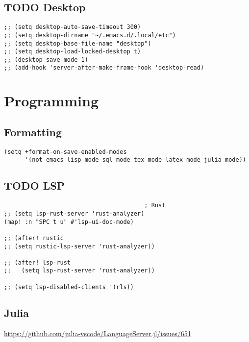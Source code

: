 \documentclass[8pt]{article}
\begin{document}
\subsection{{\bfseries\sffamily TODO} Desktop}
\label{sec:org691a6f0}
\begin{verbatim}
;; (setq desktop-auto-save-timeout 300)
;; (setq desktop-dirname "~/.emacs.d/.local/etc")
;; (setq desktop-base-file-name "desktop")
;; (setq desktop-load-locked-desktop t)
;; (desktop-save-mode 1)
;; (add-hook 'server-after-make-frame-hook 'desktop-read)
\end{verbatim}
\section{Programming}
\label{sec:org72c2fb0}
\subsection{Formatting}
\label{sec:orgc5ae76d}
\begin{verbatim}
(setq +format-on-save-enabled-modes
      '(not emacs-lisp-mode sql-mode tex-mode latex-mode julia-mode))
\end{verbatim}

\subsection{{\bfseries\sffamily TODO} LSP}
\label{sec:orgc27f4db}
\begin{verbatim}
                                        ; Rust
;; (setq lsp-rust-server 'rust-analyzer)
(map! :n "SPC t u" #'lsp-ui-doc-mode)

;; (after! rustic
;; (setq rustic-lsp-server 'rust-analyzer))

;; (after! lsp-rust
;;   (setq lsp-rust-server 'rust-analyzer))

;; (setq lsp-disabled-clients '(rls))

\end{verbatim}
\subsection{Julia}
\label{sec:org5160e5e}
\url{https://github.com/julia-vscode/LanguageServer.jl/issues/651}
\end{document}
